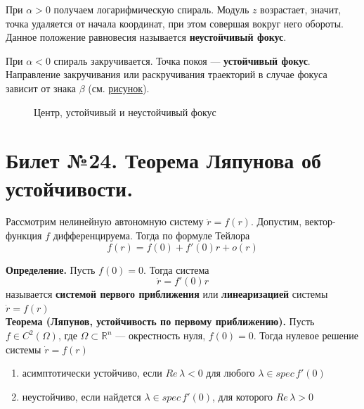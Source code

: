 \documentclass{article}
\begin{document}
При $\alpha > 0$ получаем логарифмическую спираль. Модуль $z$ возрастает, значит, точка удаляется от начала координат, при этом совершая вокруг него обороты. Данное положение равновесия называется \textbf{неустойчивый фокус}.

При $\alpha < 0$ спираль закручивается. Точка покоя --- \textbf{устойчивый фокус}. Направление закручивания или раскручивания траекторий в случае фокуса зависит от знака $\beta$ (см. \hyperref[focus]{рисунок}).

\begin{figure}[H]\label{focus}
    \caption{Центр, устойчивый и неустойчивый фокус}
\end{figure}

\section{Билет №24. Теорема Ляпунова об устойчивости.}
Рассмотрим нелинейную автономную систему $\dot{r} = f(r)$. Допустим, вектор-функция $f$ дифференцируема. Тогда по формуле Тейлора
\begin{equation*}
    f(r) = f(0) + f'(0)r + o(r)
\end{equation*}

\noindent \textbf{Определение.} Пусть $f(0) = 0$. Тогда система
\begin{equation*}
    \dot{r} = f'(0)r
\end{equation*}
называется \textbf{системой первого приближения} или \textbf{линеаризацией} системы $\dot{r} = f(r)$\\

\noindent \textbf{Теорема (Ляпунов, устойчивость по первому приближению).} Пусть $f \in C^2(\Omega)$, где $\Omega \subset \mathbb{R}^n$ --- окрестность нуля, $f(0) = 0$. Тогда нулевое решение системы $\dot{r} = f(r)$
\begin{enumerate}
    \item асимптотически устойчиво, если $Re\, \lambda < 0$ для любого $\lambda \in spec\, f'(0)$
    \item неустойчиво, если найдется $\lambda \in spec\, f'(0)$, для которого $Re\, \lambda > 0$
\end{enumerate}
\end{document}
